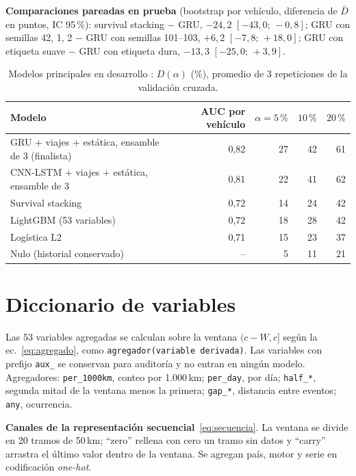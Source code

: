 \textbf{Comparaciones pareadas en prueba} (bootstrap por vehículo, diferencia de $\bar D$ en puntos, IC 95\,\%): survival
stacking $-$ GRU, $-24{,}2$ $[-43{,}0;\,-0{,}8]$; GRU con semillas 42, 1, 2 $-$ GRU con semillas 101--103, $+6{,}2$
$[-7{,}8;\,+18{,}0]$; GRU con etiqueta suave $-$ GRU con etiqueta dura, $-13{,}3$ $[-25{,}0;\,+3{,}9]$.

\begin{table}[!htbp]
\centering
\caption{Modelos principales en desarrollo \tagdev{}: $D(\alpha)$ (\%), promedio de 3 repeticiones de la validación cruzada.}
\label{tab:dev}
\begin{tabular}{@{}lrrrr@{}}
\toprule
Modelo & AUC por vehículo & $\alpha=5\,\%$ & $10\,\%$ & $20\,\%$ \\
\midrule
GRU + viajes + estática, ensamble de 3 (finalista) & 0,82 & 27 & 42 & 61 \\
CNN-LSTM + viajes + estática, ensamble de 3 & 0,81 & 22 & 41 & 62 \\
Survival stacking & 0,72 & 14 & 24 & 42 \\
LightGBM (53 variables) & 0,72 & 18 & 28 & 42 \\
Logística L2 & 0,71 & 15 & 23 & 37 \\
Nulo (historial conservado) & -- & 5 & 11 & 21 \\
\bottomrule
\end{tabular}
\end{table}

\section{Diccionario de variables}
\label{anx:features}

Las 53 variables agregadas se calculan sobre la ventana $(c - W, c]$ según la ec.~\eqref{eq:agregado}, como
\texttt{agregador(variable derivada)}. Las variables con prefijo \texttt{aux\_} se conservan para auditoría y no entran en
ningún modelo. Agregadores: \texttt{per\_1000km}, conteo por 1.000\,km; \texttt{per\_day}, por día; \texttt{half\_*},
segunda mitad de la ventana menos la primera; \texttt{gap\_*}, distancia entre eventos; \texttt{any}, ocurrencia.

{\scriptsize

}

\textbf{Canales de la representación secuencial}~\eqref{eq:secuencia}. La ventana se divide en 20 tramos de 50\,km;
``zero'' rellena con cero un tramo sin datos y ``carry'' arrastra el último valor dentro de la ventana. Se agregan país, motor
y serie en codificación \emph{one-hot}.

\begin{center}
\footnotesize

\end{center}
